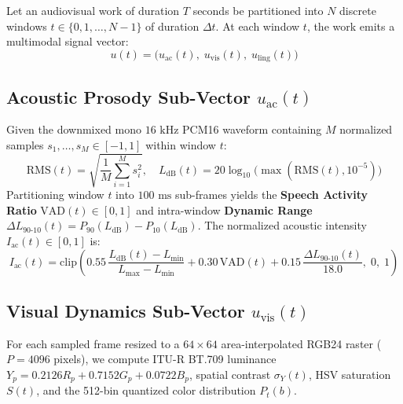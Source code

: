 \documentclass[10pt,letterpaper]{article}
\begin{document}
Let an audiovisual work of duration $T$ seconds be partitioned into $N$ discrete windows $t \in \{0, 1, \dots, N-1\}$ of duration $\Delta t$. At each window $t$, the work emits a multimodal signal vector:
\begin{equation}
  u(t) = \bigl(u_{\mathrm{ac}}(t),\; u_{\mathrm{vis}}(t),\; u_{\mathrm{ling}}(t)\bigr)
\end{equation}

\subsection{Acoustic Prosody Sub-Vector \texorpdfstring{$u_{\mathrm{ac}}(t)$}{u\_ac(t)}}
Given the downmixed mono $16\text{ kHz}$ PCM16 waveform containing $M$ normalized samples $s_1, \dots, s_M \in [-1, 1]$ within window $t$:
\begin{equation}
  \mathrm{RMS}(t) = \sqrt{\frac{1}{M}\sum_{i=1}^{M} s_i^2}, \quad
  L_{\mathrm{dB}}(t) = 20 \log_{10}\!\bigl(\max(\mathrm{RMS}(t), 10^{-5})\bigr)
\end{equation}
Partitioning window $t$ into $100\text{ ms}$ sub-frames yields the \textbf{Speech Activity Ratio} $\mathrm{VAD}(t) \in [0, 1]$ and intra-window \textbf{Dynamic Range} $\Delta L_{90\text{-}10}(t) = P_{90}(L_{\mathrm{dB}}) - P_{10}(L_{\mathrm{dB}})$. The normalized acoustic intensity $I_{\mathrm{ac}}(t) \in [0, 1]$ is:
\begin{equation}
  I_{\mathrm{ac}}(t) = \mathrm{clip}\!\left(0.55\,\frac{L_{\mathrm{dB}}(t) - L_{\min}}{L_{\max} - L_{\min}} + 0.30\,\mathrm{VAD}(t) + 0.15\,\frac{\Delta L_{90\text{-}10}(t)}{18.0},\; 0,\; 1\right)
\end{equation}

\subsection{Visual Dynamics Sub-Vector \texorpdfstring{$u_{\mathrm{vis}}(t)$}{u\_vis(t)}}
For each sampled frame resized to a $64\times 64$ area-interpolated RGB24 raster ($P = 4096$ pixels), we compute ITU-R BT.709 luminance $Y_p = 0.2126 R_p + 0.7152 G_p + 0.0722 B_p$, spatial contrast $\sigma_Y(t)$, HSV saturation $S(t)$, and the 512-bin quantized color distribution $P_t(b)$.
\end{document}
